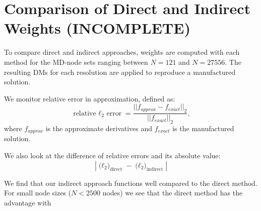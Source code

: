 \section{Comparison of Direct and Indirect Weights (INCOMPLETE)} 


To compare direct and indirect approaches, weights are computed with each method for the MD-node sets ranging between $N = 121$ and $N=27556$. The resulting DMs for each resolution are applied to reproduce a manufactured solution. 

We monitor relative error in approximation, defined as: 
$$ \text{relative $\ell_{2}$ error} = \frac{|| f_{approx} - f_{exact} ||_{2} }{ || f_{exact} ||_{2} }, $$ 
where $f_{approx}$ is the approximate derivatives and $f_{exact}$ is the manufactured solution. 


We also look at the difference of relative errors and its absolute value: 
$$
|\text{($\ell_{2}$)}_{\text{direct}} - \text{($\ell_{2}$)}_{\text{indirect}}|
$$

We find that our indirect approach functions well compared to the direct method. For small node sizes ($N < 2500$ nodes) we see that the direct method has the advantage with 


